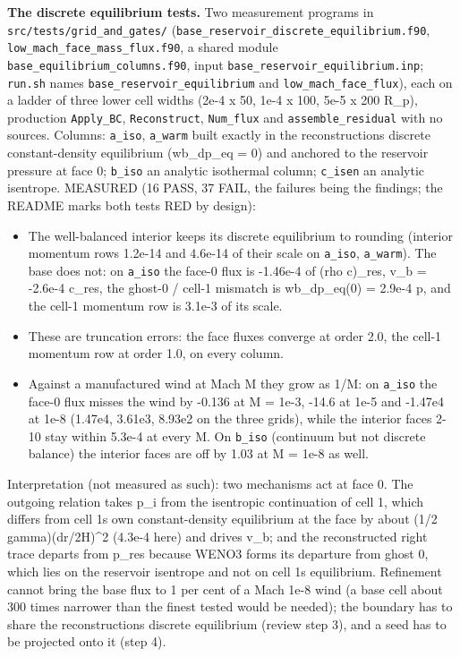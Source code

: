 \documentclass[english,a4paper]{my_memo}
\providecommand{\tightlist}{\setlength{\itemsep}{0pt}\setlength{\parskip}{0pt}}
\begin{document}
\textbf{The discrete equilibrium tests.} Two measurement programs in
\texttt{src/tests/grid\_and\_gates/} (\texttt{base\_reservoir\_discrete\_equilibrium.f90},
\texttt{low\_mach\_face\_mass\_flux.f90}, a shared module \texttt{base\_equilibrium\_columns.f90},
input \texttt{base\_reservoir\_equilibrium.inp}; \texttt{run.sh} names
\texttt{base\_reservoir\_equilibrium} and \texttt{low\_mach\_face\_flux}), each on a ladder of
three lower cell widths (2e-4 x 50, 1e-4 x 100, 5e-5 x 200 R\_p), production
\texttt{Apply\_BC}, \texttt{Reconstruct}, \texttt{Num\_flux} and \texttt{assemble\_residual} with no
sources. Columns: \texttt{a\_iso}, \texttt{a\_warm} built exactly in the reconstruction\textquotesingle s
discrete constant-density equilibrium (wb\_dp\_eq = 0) and anchored to the
reservoir pressure at face 0; \texttt{b\_iso} an analytic isothermal column; \texttt{c\_isen}
an analytic isentrope. MEASURED (16 PASS, 37 FAIL, the failures being the
findings; the README marks both tests RED by design):

\begin{itemize}
\tightlist
\item
  The well-balanced interior keeps its discrete equilibrium to rounding
  (interior momentum rows 1.2e-14 and 4.6e-14 of their scale on \texttt{a\_iso},
  \texttt{a\_warm}). The base does not: on \texttt{a\_iso} the face-0 flux is -1.46e-4 of
  (rho c)\_res, v\_b = -2.6e-4 c\_res, the ghost-0 / cell-1 mismatch is
  wb\_dp\_eq(0) = 2.9e-4 p, and the cell-1 momentum row is 3.1e-3 of its scale.
\item
  These are truncation errors: the face fluxes converge at order 2.0, the
  cell-1 momentum row at order 1.0, on every column.
\item
  Against a manufactured wind at Mach M they grow as 1/M: on \texttt{a\_iso} the
  face-0 flux misses the wind by -0.136 at M = 1e-3, -14.6 at 1e-5 and -1.47e4
  at 1e-8 (1.47e4, 3.61e3, 8.93e2 on the three grids), while the interior
  faces 2-10 stay within 5.3e-4 at every M. On \texttt{b\_iso} (continuum but not
  discrete balance) the interior faces are off by 1.03 at M = 1e-8 as well.
\end{itemize}

Interpretation (not measured as such): two mechanisms act at face 0. The
outgoing relation takes p\_i from the isentropic continuation of cell 1, which
differs from cell 1\textquotesingle s own constant-density equilibrium at the face by about
(1/2 gamma)(dr/2H)\^{}2 (4.3e-4 here) and drives v\_b; and the reconstructed
right trace departs from p\_res because WENO3 forms its departure from ghost
0, which lies on the reservoir isentrope and not on cell 1\textquotesingle s equilibrium.
Refinement cannot bring the base flux to 1 per cent of a Mach 1e-8 wind (a
base cell about 300 times narrower than the finest tested would be needed);
the boundary has to share the reconstruction\textquotesingle s discrete equilibrium (review
step 3), and a seed has to be projected onto it (step 4).
\end{document}
